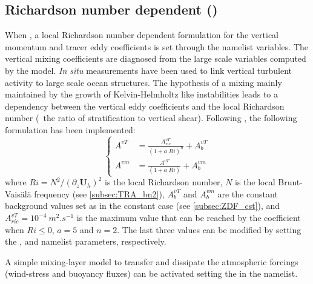 \documentclass[../main/NEMO_manual]{subfiles}
\begin{document}
\subsection[Richardson number dependent (\forcode{ln_zdfric})]{Richardson number dependent (\protect{})}
\label{subsec:ZDF_ric}

\begin{listing}
  \caption{}
  \label{lst:namzdf_ric}
\end{listing}

When , a local Richardson number dependent formulation for the vertical momentum and
tracer eddy coefficients is set through the  namelist variables.
The vertical mixing coefficients are diagnosed from the large scale variables computed by the model.
\textit{In situ} measurements have been used to link vertical turbulent activity to large scale ocean structures.
The hypothesis of a mixing mainly maintained by the growth of Kelvin-Helmholtz like instabilities leads to
a dependency between the vertical eddy coefficients and the local Richardson number
(\ie\ the ratio of stratification to vertical shear).
Following \citet{pacanowski.philander_JPO81}, the following formulation has been implemented:
\[
  \left\{
    \begin{aligned}
      A^{vT} &= \frac {A_{ric}^{vT}}{\left( 1+a \; Ri \right)^n} + A_b^{vT}       \\
      A^{vm} &= \frac{A^{vT}        }{\left( 1+ a \;Ri  \right)   } + A_b^{vm}
    \end{aligned}
  \right.
\]
where $Ri = N^2 / \left(\partial_z \textbf{U}_h \right)^2$ is the local Richardson number,
$N$ is the local Brunt-Vais\"{a}l\"{a} frequency (see \autoref{subsec:TRA_bn2}),
$A_b^{vT} $ and $A_b^{vm}$ are the constant background values set as in the constant case
(see \autoref{subsec:ZDF_cst}), and $A_{ric}^{vT} = 10^{-4}~m^2.s^{-1}$ is the maximum value that
can be reached by the coefficient when $Ri\leq 0$, $a=5$ and $n=2$.
The last three values can be modified by setting the ,  and
 namelist parameters, respectively.

A simple mixing-layer model to transfer and dissipate the atmospheric forcings
(wind-stress and buoyancy fluxes) can be activated setting the  in the namelist.
\end{document}
